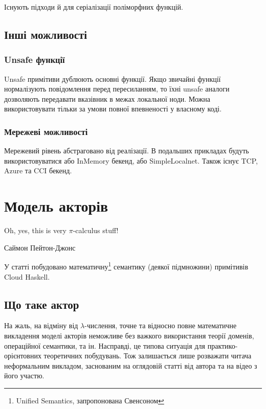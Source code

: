 \documentclass[12pt]{article}
\begin{document}
Існують підходи й для серіалізації поліморфних функцій.\\

\subsection{Інші можливості}

\subsubsection*{Unsafe функції}
Unsafe примітиви дублюють основні функції. Якщо звичайні функції нормалізують повідомлення перед пересиланням, 
то їхні unsafe аналоги дозволяють передавати вказівник в межах локальної ноди. Можна використовувати тільки 
за умови повної впевненості у власному коді.\\

\subsubsection*{Мережеві можливості}
Мережевий рівень абстраговано від реалізації. В подальших прикладах будуть використовуватися або InMemory бекенд, або SimpleLocalnet. 
Також існує TCP, Azure та CCI бекенд.\\



\section{Модель акторів}

\epigraph{Oh, yes, this is very $\pi$-calculus stuff!}{Саймон Пейтон-Джонс\cite{cloudSLPJ}}

У статті\cite{cloudSemantics} побудовано математичну\footnote{Unified Semantics, запропонована Свенсоном\cite{svensson}} семантику (деякої підмножини) примітивів Cloud Haskell.\\

\subsection{Що таке актор}

На жаль, на відміну від $\lambda$-числення, точне та відносно повне математичне викладення моделі акторів неможливе без важкого використання теорії доменів, операційної семантики, та ін. Насправді, це типова ситуація для практико-орієнтовних теоретичних побудувань. Тож залишається лише розважати читача неформальним викладом, заснованим на оглядовій статті від автора\cite{hewitt} та на відео\cite{actorsVideo} з його участю.\\
\end{document}
